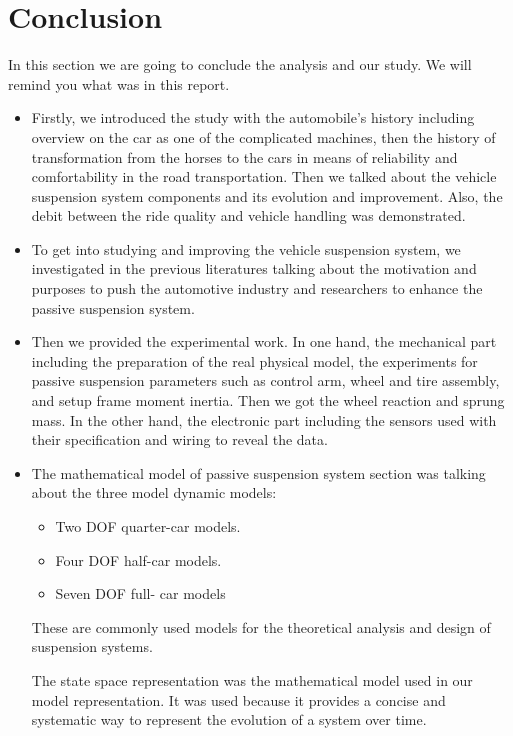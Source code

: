 








\iffalse
\section{Conclusion}
In this section we are going to conclude the analysis and our study. We will remind you what was in this report.
\begin{itemize}
	\item Firstly, we introduced the study with the automobile's history including overview on the car as one of the complicated machines, then the history of transformation from the horses to the cars in means of reliability and comfortability in the road transportation. Then we talked about the vehicle suspension system components and its evolution and improvement. Also, the debit between the ride quality and vehicle handling was demonstrated.
	\item To get into studying and improving the vehicle suspension system, we investigated in the previous literatures talking about the motivation and purposes to push the automotive industry and researchers to enhance the passive suspension system.
	\item Then we provided the experimental work. In one hand, the mechanical part including the preparation of the real physical model, the experiments for passive suspension parameters such as control arm, wheel and tire assembly, and setup frame moment inertia. Then we got the wheel reaction and sprung mass. In the other hand, the electronic part including the sensors used with their specification and wiring to reveal the data.
	\item The mathematical model of passive suspension system section was talking about the three model dynamic models:
	\begin{itemize}
		\item Two DOF quarter-car models.
		\item Four DOF half-car models.
		\item Seven DOF full- car models
	\end{itemize}
	
	These are commonly used models for the theoretical analysis and design of suspension systems.
	
	The state space representation was the mathematical model used in our model representation. It was used because it provides a concise and systematic way to represent the evolution of a system over time.
	

\end{itemize}
